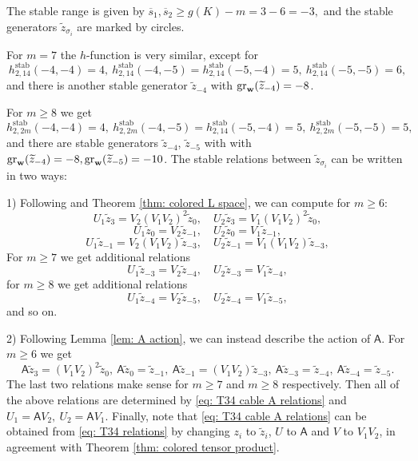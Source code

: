 \documentclass{amsart}
\newcommand{\w}{\mathbf{w}}
\def\gr{\textup{gr}}
\def\w{{\bf{w}}}
\newcommand{\stab}{\mathrm{stab}}
\newcommand{\AAA}{\mathsf{A}}
\begin{document}
The stable range is given by $\overline{s}_1,\overline{s}_2\ge g(K)-m=3-6=-3,$
and the stable generators $\widetilde{z}_{\sigma_i}$ are marked by circles. 

For $m=7$ the $h$-function is very similar, except for
$$
h^{\stab}_{2,14}(-4,-4)=4,\
h^{\stab}_{2,14}(-4,-5)=h^{\stab}_{2,14}(-5,-4)=5,\ h^{\stab}_{2,14}(-5,-5)=6,
$$
and there is another stable generator $\widetilde{z}_{-4}$ with $\gr_{\w}(\widetilde{z}_{-4})=-8$.

For $m\ge 8$ we get
$$
h^{\stab}_{2,2m}(-4,-4)=4,\
h^{\stab}_{2,2m}(-4,-5)=h^{\stab}_{2,14}(-5,-4)=5,\ h^{\stab}_{2,2m}(-5,-5)=5,
$$
and there are stable generators $\widetilde{z}_{-4}$, $\widetilde{z}_{-5}$ with with $\gr_{\w}(\widetilde{z}_{-4})=-8,\gr_{\w}(\widetilde{z}_{-5})=-10$.
The stable relations between $\widetilde{z}_{\sigma_i}$ can be written in two ways:

1) Following \cite{BLZ} and Theorem \ref{thm: colored L space}, we can compute for $m\ge 6$:
$$
U_1\widetilde{z}_{3}=V_2(V_1V_2)^2\widetilde{z}_{0},\quad U_2\widetilde{z}_{3}=V_1(V_1V_2)^2\widetilde{z}_{0},
$$
$$
U_1\widetilde{z}_{0}=V_2\widetilde{z}_{-1},\quad U_2\widetilde{z}_{0}=V_1\widetilde{z}_{-1},
$$
$$
U_1\widetilde{z}_{-1}=V_2(V_1V_2)\widetilde{z}_{-3},\quad U_2\widetilde{z}_{-1}=V_1(V_1V_2)\widetilde{z}_{-3},
$$
For $m\ge 7$ we get additional relations
$$
U_1\widetilde{z}_{-3}=V_2\widetilde{z}_{-4},\quad U_2\widetilde{z}_{-3}=V_1\widetilde{z}_{-4},
$$
for $m\ge 8$ we get additional relations
$$
U_1\widetilde{z}_{-4}=V_2\widetilde{z}_{-5},\quad U_2\widetilde{z}_{-4}=V_1\widetilde{z}_{-5},
$$
and so on.

2) Following Lemma \ref{lem: A action}, we can instead describe the action of $\AAA$. For $m\ge 6$ we get 
\begin{equation}
\label{eq: T34 cable A relations}
\AAA\widetilde{z}_3=(V_1V_2)^2\widetilde{z}_0,\ 
\AAA\widetilde{z}_0=\widetilde{z}_{-1},\
\AAA\widetilde{z}_{-1}=(V_1V_2)\widetilde{z}_{-3},\
\AAA\widetilde{z}_{-3}=\widetilde{z}_{-4},\
\AAA\widetilde{z}_{-4}=\widetilde{z}_{-5}.
\end{equation}
The last two relations make sense for $m\ge 7$ and $m\ge 8$ respectively. Then all of the above relations are determined by \eqref{eq: T34 cable A relations} and
$
U_1=\AAA V_2,\ U_2=\AAA V_1.
$
Finally, note that \eqref{eq: T34 cable A relations} can be obtained from \eqref{eq: T34 relations} by changing $z_i$ to $\widetilde{z}_i$, $U$ to $\AAA$ and $V$ to $V_1V_2$, in agreement with Theorem \ref{thm: colored tensor product}.
 
\end{document}
